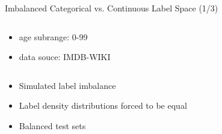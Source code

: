 \begin{frame}{Imbalanced Categorical vs. Continuous Label Space (1/3)}
\begin{columns}
\begin{column}{0.5\textwidth}
\begin{itemize}
				\item age subrange: 0-99
				\item data souce: IMDB-WIKI
			\end{itemize}
		\end{column}
	\end{columns}
	\vspace{0.5em}
	\begin{itemize}
		\centering\item Simulated label imbalance
		\centering\item Label density distributions forced to be equal
		\centering\item Balanced test sets
	\end{itemize}
\end{frame}

